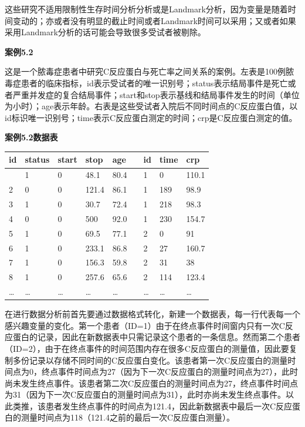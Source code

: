 \documentclass[
  chinese-hans,
  letterpaper,
  DIV=11,
  numbers=noendperiod]{scrreprt}
\newcounter{none} %
\begin{document}
这些研究不适用限制性生存时间分析分析或是Landmark分析，因为变量是随着时间变动的；亦或者没有明显的截止时间或者Landmark时间可以采用；又或者如果采用Landmark分析的话可能会导致很多受试者被剔除。

\textbf{案例5.2}

这是一个脓毒症患者中研究C反应蛋白与死亡率之间关系的案例。左表是100例脓毒症患者的临床指标，id表示受试者的唯一识别号；status表示结局事件是死亡或者严重并发症的复合结局事件；start和stop表示基线和结局事件发生的时间（单位为小时）；age表示年龄。右表是这些受试者入院后不同时间点的C反应蛋白值，以id标识唯一识别号；time表示C反应蛋白测定的时间；crp是C反应蛋白测定的值。

\textbf{案例5.2数据表}

{\def\LTcaptype{none} %
\begin{longtable}[]{@{}lllllllll@{}}
\toprule\noalign{}
id & status & start & stop & age & & id & time & crp \\
\midrule\noalign{}
\endhead
\bottomrule\noalign{}
\endlastfoot
1 & 1 & 0 & 48.1 & 80.4 & & 1 & 0 & 110.1 \\
2 & 0 & 0 & 121.4 & 86.1 & & 1 & 189 & 98.9 \\
3 & 1 & 0 & 30.7 & 72.4 & & 1 & 218 & 98.3 \\
4 & 0 & 0 & 500 & 92.0 & & 1 & 230 & 154.7 \\
5 & 1 & 0 & 69.5 & 77.1 & & 2 & 0 & 91 \\
6 & 1 & 0 & 233.1 & 86.8 & & 2 & 27 & 160.7 \\
7 & 1 & 0 & 156.3 & 59.8 & & 2 & 31 & 38 \\
8 & 1 & 0 & 257.6 & 65.6 & & 2 & 114 & 123.4 \\
\ldots{} & \ldots{} & \ldots{} & \ldots{} & \ldots{} & & \ldots{} &
\ldots{} & \ldots{} \\
\end{longtable}
}

在进行数据分析前首先要通过数据格式转化，新建一个数据表，每一行代表每一个感兴趣变量的变化。第一个患者（ID=1）由于在终点事件时间窗内只有一次C反应蛋白的记录，因此在新数据表中只需记录这个患者的一条信息。然而第二个患者（ID=2），由于在终点事件的时间范围内存在很多C反应蛋白的测量值，因此要复制多份记录以存储不同时间的C反应蛋白变化。该患者第一次C反应蛋白的测量时间点为0，终点事件时间点为27（因为下一次C反应蛋白的测量时间点为27），此时尚未发生终点事件。该患者第二次C反应蛋白的测量时间点为27，终点事件时间点为31（因为下一次C反应蛋白的测量时间点为31），此时亦尚未发生终点事件。以此类推，该患者发生终点事件的时间点为121.4，因此新数据表中最后一次C反应蛋白的测量时间点为118（121.4之前的最后一次C反应蛋白测量）。
\end{document}
